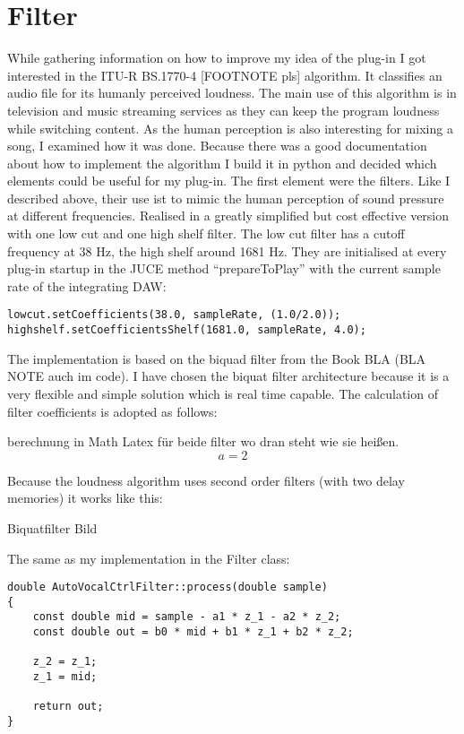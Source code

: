 \section{Filter}

While gathering information on how to improve my idea of the plug-in I got interested in the ITU-R BS.1770-4 [FOOTNOTE pls] algorithm. It classifies an audio file for its humanly perceived loudness. The main use of this algorithm is in television and music streaming services as they can keep the program loudness while switching content. As the human perception is also interesting for mixing a song, I examined how it was done. Because there was a good documentation about how to implement the algorithm I build it in python and decided which elements could be useful for my plug-in. The first element were the filters. Like I described above, their use ist to mimic the human perception of sound pressure at different frequencies. Realised in a greatly simplified but cost effective version with one low cut and one high shelf filter. The low cut filter has a cutoff frequency at 38 Hz, the high shelf around 1681 Hz. They are initialised at every plug-in startup in the JUCE method “prepareToPlay” with the current sample rate of the integrating DAW:

\lstset{language=C++}
\begin{lstlisting}[frame=single]
lowcut.setCoefficients(38.0, sampleRate, (1.0/2.0));
highshelf.setCoefficientsShelf(1681.0, sampleRate, 4.0);
\end{lstlisting}

The implementation is based on the biquad filter from the Book BLA (BLA NOTE auch im code).  I have chosen the biquat filter architecture because it is a very flexible and simple solution which is real time capable. The calculation of filter coefficients is adopted as follows:

berechnung in Math Latex für beide filter wo dran steht wie sie heißen. $$ a = 2$$

Because the loudness algorithm uses second order filters (with two delay memories) it works like this:

Biquatfilter Bild

The same as my implementation in the Filter class:

\begin{lstlisting}[frame=single]
double AutoVocalCtrlFilter::process(double sample)
{
    const double mid = sample - a1 * z_1 - a2 * z_2;
    const double out = b0 * mid + b1 * z_1 + b2 * z_2;
    
    z_2 = z_1;
    z_1 = mid;
    
    return out;
}
\end{lstlisting}



